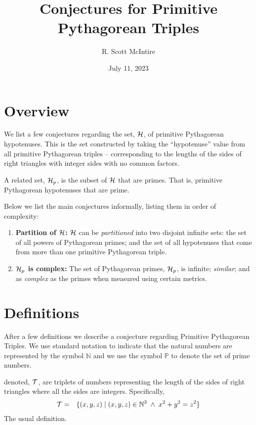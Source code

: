 \documentclass{article}
\title{Conjectures for Primitive Pythagorean Triples}
\author{R. Scott McIntire}
\date{July 11, 2023}
\theoremstyle{definition}
\begin{document}
\maketitle


\section{Overview}
We list a few conjectures regarding the set, ${\cal H}$, of primitive 
Pythagorean hypotenuses. This is the set constructed by taking the 
``hypotenuse'' value from all primitive Pythagorean triples -- corresponding 
to the lengths of the sides of right triangles with integer sides with 
no common factors.

A related set, ${\cal H}_p$, is the subset of ${\cal H}$ that are primes. 
That is, primitive Pythagorean hypotenuses that are prime.

Below we list the main conjectures informally, listing them in order of 
complexity:
\begin{enumerate}
  \item{{\bf Partition of ${\cal H}$:\/} ${\cal H}$ can be {\em partitioned\/} 
      into two disjoint infinite sets: 
    the set of all powers of Pythagorean primes; and the set of all 
        hypotenuses that come from more than one primitive Pythagorean triple.}
  \item{{\bf ${\cal H}_p$ is complex:\/} The set of Pythagorean primes, 
      ${\cal H}_p$, is infinite; {\em similar\/}; and as {\em complex\/} as 
        the primes when measured using certain metrics.}
\end{enumerate}


\section{Definitions}
After a few definitions we describe a conjecture regarding Primitive 
Pythagorean Triples. We use standard notation to indicate that the natural 
numbers are represented by the symbol $\mathbb{N}$ and 
we use the symbol $\mathbb{P}$ to denote the set of prime numbers.


 denoted, ${\cal T}$, are  triplets of 
numbers representing the length of the sides of
right triangles where all the sides are integers. Specifically,
\begin{eqnarray}
  {\cal T} & = & \{ (x,y,z) \; | \; (x,y,z) \in \mathbb{N}^3 \; \wedge \; x^2 + y^2 = z^2 \}
\end{eqnarray}
The usual definition.
\end{document}
